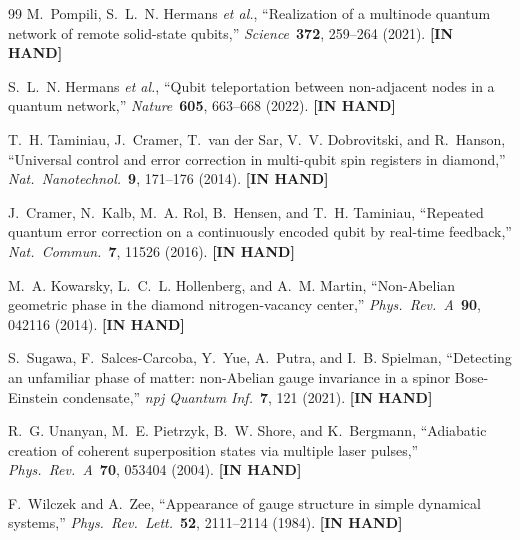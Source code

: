 \documentclass[11pt,letterpaper]{article}
\newcommand{\inhand}{\textcolor{green!50!black}{\textbf{[IN HAND]}}}
\begin{document}
\begin{thebibliography}{99}
M.~Pompili, S.~L.~N. Hermans \textit{et al.},
``Realization of a multinode quantum network of remote solid-state qubits,''
\textit{Science}\ \textbf{372}, 259--264 (2021). \inhand

S.~L.~N. Hermans \textit{et al.},
``Qubit teleportation between non-adjacent nodes in a quantum network,''
\textit{Nature}\ \textbf{605}, 663--668 (2022). \inhand

T.~H. Taminiau, J.~Cramer, T.~van der Sar, V.~V. Dobrovitski, and R.~Hanson,
``Universal control and error correction in multi-qubit spin registers in diamond,''
\textit{Nat.\ Nanotechnol.}\ \textbf{9}, 171--176 (2014). \inhand

J.~Cramer, N.~Kalb, M.~A. Rol, B.~Hensen, and T.~H. Taminiau,
``Repeated quantum error correction on a continuously encoded qubit by real-time feedback,''
\textit{Nat.\ Commun.}\ \textbf{7}, 11526 (2016). \inhand

M.~A. Kowarsky, L.~C.~L. Hollenberg, and A.~M. Martin,
``Non-Abelian geometric phase in the diamond nitrogen-vacancy center,''
\textit{Phys.\ Rev.\ A}\ \textbf{90}, 042116 (2014). \inhand

S.~Sugawa, F.~Salces-Carcoba, Y.~Yue, A.~Putra, and I.~B. Spielman,
``Detecting an unfamiliar phase of matter: non-Abelian gauge invariance in a spinor Bose-Einstein condensate,''
\textit{npj Quantum Inf.}\ \textbf{7}, 121 (2021). \inhand

R.~G. Unanyan, M.~E. Pietrzyk, B.~W. Shore, and K.~Bergmann,
``Adiabatic creation of coherent superposition states via multiple laser pulses,''
\textit{Phys.\ Rev.\ A}\ \textbf{70}, 053404 (2004). \inhand

F.~Wilczek and A.~Zee,
``Appearance of gauge structure in simple dynamical systems,''
\textit{Phys.\ Rev.\ Lett.}\ \textbf{52}, 2111--2114 (1984). \inhand

\end{thebibliography}
\end{document}
